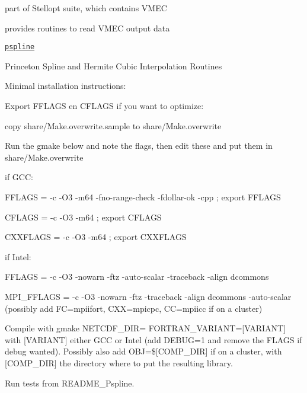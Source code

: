 \begin{DoxyItemize}
\begin{DoxyItemize}
\item part of Stellopt suite, which contains V\+M\+EC
\item provides routines to read V\+M\+EC output data
\end{DoxyItemize}
\item \href{https://w3.pppl.gov/ntcc/PSPLINE/}{\tt pspline}
\begin{DoxyItemize}
\item Princeton Spline and Hermite Cubic Interpolation Routines
\item Minimal installation instructions\+:
\begin{DoxyEnumerate}
\item Export {\ttfamily F\+F\+L\+A\+GS} en {\ttfamily C\+F\+L\+A\+GS} if you want to optimize\+:
\begin{DoxyItemize}
\item copy {\ttfamily share/\+Make.\+overwrite.\+sample} to {\ttfamily share/\+Make.\+overwrite}
\item Run the gmake below and note the flags, then edit these and put them in {\ttfamily share/\+Make.\+overwrite}
\item if G\+CC\+:
\begin{DoxyItemize}
\item {\ttfamily F\+F\+L\+A\+GS = -\/c -\/\+O3 -\/m64 -\/fno-\/range-\/check -\/fdollar-\/ok -\/cpp ; export F\+F\+L\+A\+GS}
\item {\ttfamily C\+F\+L\+A\+GS = -\/c -\/\+O3 -\/m64 ; export C\+F\+L\+A\+GS}
\item {\ttfamily C\+X\+X\+F\+L\+A\+GS = -\/c -\/\+O3 -\/m64 ; export C\+X\+X\+F\+L\+A\+GS}
\end{DoxyItemize}
\item if Intel\+:
\begin{DoxyItemize}
\item {\ttfamily F\+F\+L\+A\+GS = -\/c -\/\+O3 -\/nowarn -\/ftz -\/auto-\/scalar -\/traceback -\/align dcommons}
\item {\ttfamily M\+P\+I\+\_\+\+F\+F\+L\+A\+GS = -\/c -\/\+O3 -\/nowarn -\/ftz -\/traceback -\/align dcommons -\/auto-\/scalar} (possibly add FC=mpiifort, {\ttfamily C\+XX=mpicpc}, {\ttfamily CC=mpiicc} if on a cluster)
\end{DoxyItemize}
\end{DoxyItemize}
\item Compile with {\ttfamily gmake N\+E\+T\+C\+D\+F\+\_\+\+D\+IR= F\+O\+R\+T\+R\+A\+N\+\_\+\+V\+A\+R\+I\+A\+NT=\mbox{[}V\+A\+R\+I\+A\+NT\mbox{]}} with {\ttfamily \mbox{[}V\+A\+R\+I\+A\+NT\mbox{]}} either {\ttfamily G\+CC} or {\ttfamily Intel} (add {\ttfamily D\+E\+B\+UG=1} and remove the F\+L\+A\+GS if debug wanted). Possibly also add {\ttfamily O\+BJ=\$\mbox{[}C\+O\+M\+P\+\_\+\+D\+IR\mbox{]}} if on a cluster, with {\ttfamily \mbox{[}C\+O\+M\+P\+\_\+\+D\+IR\mbox{]}} the directory where to put the resulting library.
\item Run tests from {\ttfamily R\+E\+A\+D\+M\+E\+\_\+\+Pspline}.
\end{DoxyEnumerate}
\end{DoxyItemize}
\end{DoxyItemize}

